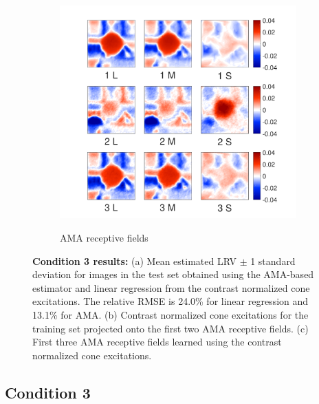 \documentclass{jov}
\begin{document}
\begin{figure}
\begin{subfigure}[b]{0.31\textwidth}
        \label{fig:case3RFResponse}
    \end{subfigure}
    \begin{subfigure}[b]{0.32 \textwidth}
	\caption{AMA receptive fields}
	\includegraphics[width=1.0\textwidth, trim={0.2cm -0.cm 0 0.3cm}]{../FiguresDraft5/Figure12/Figure12_c.pdf}
	\label{fig:case3RFs}
    \end{subfigure}
    \caption{{\bf Condition 3 results:} (a) Mean estimated LRV $\pm$ 1 standard deviation for images in the test set obtained using the AMA-based estimator and linear regression from the contrast normalized cone excitations. The relative RMSE is 24.0\%  for linear regression and 13.1\% for AMA. (b) Contrast normalized cone excitations for the training set projected onto the first two AMA receptive fields. (c) First three AMA receptive fields learned using the contrast normalized cone excitations.}
\label{fig:Condition3}
\end{figure}

\subsection{Condition 3}
\end{document}
